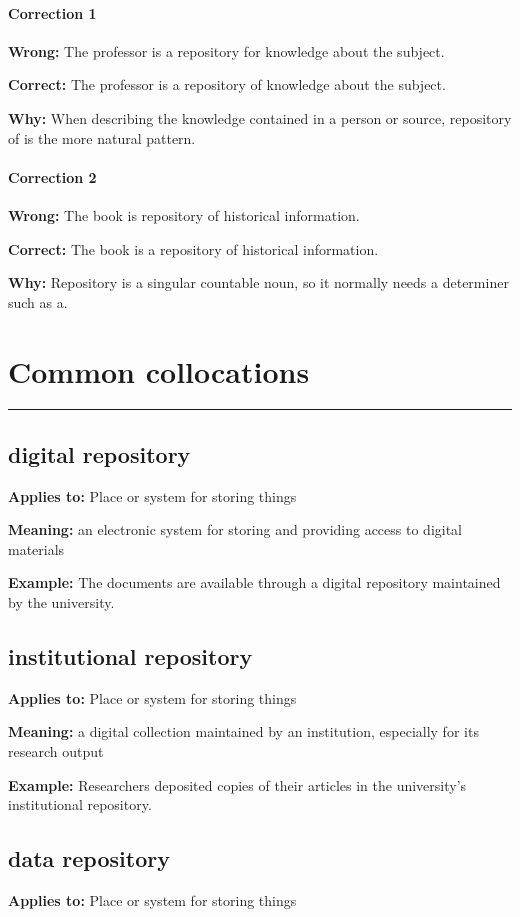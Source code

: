 \documentclass[11pt]{article}
\newcommand{\sectionrule}{\par\vspace{-0.5em}\noindent\textcolor{Accent}{\rule{\linewidth}{0.6pt}}\par}
\begin{document}
\paragraph{Correction 1}
\textbf{Wrong:} The professor is a repository for knowledge about the subject.

\textbf{Correct:} The professor is a repository of knowledge about the subject.

\textbf{Why:} When describing the knowledge contained in a person or source, repository of is the more natural pattern.

\paragraph{Correction 2}
\textbf{Wrong:} The book is repository of historical information.

\textbf{Correct:} The book is a repository of historical information.

\textbf{Why:} Repository is a singular countable noun, so it normally needs a determiner such as a.

\section{Common collocations}
\sectionrule
\subsection{digital repository}
\textbf{Applies to:} Place or system for storing things

\textbf{Meaning:} an electronic system for storing and providing access to digital materials

\textbf{Example:} The documents are available through a digital repository maintained by the university.

\subsection{institutional repository}
\textbf{Applies to:} Place or system for storing things

\textbf{Meaning:} a digital collection maintained by an institution, especially for its research output

\textbf{Example:} Researchers deposited copies of their articles in the university's institutional repository.

\subsection{data repository}
\textbf{Applies to:} Place or system for storing things
\end{document}
